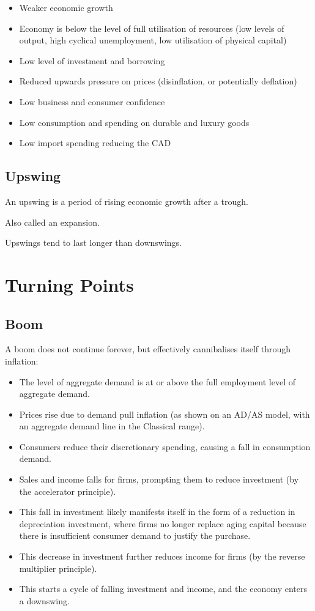 \documentclass[a4paper,11pt]{report}
\begin{document}
\begin{itemize}
\item Weaker economic growth
\item Economy is below the level of full utilisation of resources (low levels
	of output, high cyclical unemployment, low utilisation of physical capital)
\item Low level of investment and borrowing
\item Reduced upwards pressure on prices (disinflation, or potentially
	deflation)
\item Low business and consumer confidence
\item Low consumption and spending on durable and luxury goods
\item Low import spending reducing the CAD
\end{itemize}

\subsection{Upswing}

An upswing is a period of rising economic growth after a trough.

Also called an expansion.

Upswings tend to last longer than downswings.


\section{Turning Points}

\subsection{Boom}

A boom does not continue forever, but effectively cannibalises itself through
inflation:

\begin{itemize}
\item The level of aggregate demand is at or above the full employment level of
	aggregate demand.
\item Prices rise due to demand pull inflation (as shown on an AD/AS model, with
	an aggregate demand line in the Classical range).
\item Consumers reduce their discretionary spending, causing a fall in
	consumption demand.
\item Sales and income falls for firms, prompting them to reduce investment (by
	the accelerator principle).
\item This fall in investment likely manifests itself in the form of a reduction
	in depreciation investment, where firms no longer replace aging capital
	because there is insufficient consumer demand to justify the purchase.
\item This decrease in investment further reduces income for firms (by the
	reverse multiplier principle).
\item This starts a cycle of falling investment and income, and the economy
	enters a downswing.
\end{itemize}
\end{document}
